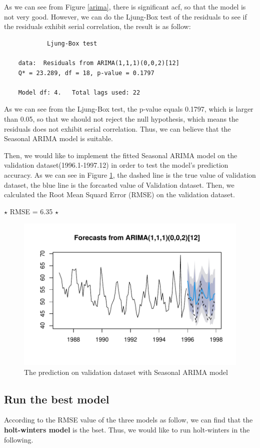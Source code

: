 \documentclass{article}
\begin{document}
As we can see from Figure \ref{arima}, there is significant acf, so that the model is not very good. However, we can do the Ljung-Box test of the residuals to see if the residuals exhibit serial correlation, the result is as follow:
\begin{lstlisting}
            Ljung-Box test

    data:  Residuals from ARIMA(1,1,1)(0,0,2)[12]
    Q* = 23.289, df = 18, p-value = 0.1797
    
    Model df: 4.   Total lags used: 22
\end{lstlisting}
As we can see from the Ljung-Box test, the p-value equals 0.1797, which is larger than 0.05, so that we should not reject the null hypothesis, which means 
the residuals does not exhibit serial correlation. Thus, we can believe that the Seasonal ARIMA model is suitable.

Then, we would like to implement the fitted Seasonal ARIMA model on the validation dataset(1996.1-1997.12) in order to test the model's prediction accuracy. As we can see in Figure \ref{cvd-arima-forecast}, the dashed line is the true 
value of validation dataset, the blue line is the forcasted value of Validation dataset. Then, we calculated the Root Mean Squard Error (RMSE) on the validation dataset. 

$\star$ RMSE = 6.35 $\star$
\begin{figure}[H]
    \centering
    \includegraphics[width=0.65\linewidth]{images/cvd-arima-forecast}
    \caption{The prediction on validation dataset with Seasonal ARIMA model}
    \label{cvd-arima-forecast}
\end{figure}

\vspace{4pt}
\subsection{Run the best model}

According to the RMSE value of the three models as follow, we can find that the \textbf{holt-winters model} is the bset. Thus, we would like to run holt-winters in the following.
\end{document}
